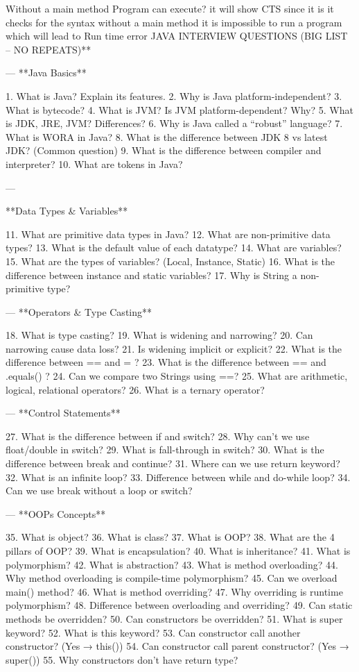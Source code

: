 Without a main method Program can execute?
it will show CTS since it is it checks for the syntax
without a main method it is impossible to run a program which will lead to Run time error
JAVA INTERVIEW QUESTIONS (BIG LIST – NO REPEATS)**

---
 **Java Basics**

1. What is Java? Explain its features.
2. Why is Java platform-independent?
3. What is bytecode?
4. What is JVM? Is JVM platform-dependent? Why?
5. What is JDK, JRE, JVM? Differences?
6. Why is Java called a “robust” language?
7. What is WORA in Java?
8. What is the difference between JDK 8 vs latest JDK? (Common question)
9. What is the difference between compiler and interpreter?
10. What are tokens in Java?

---

 **Data Types & Variables**

11. What are primitive data types in Java?
12. What are non-primitive data types?
13. What is the default value of each datatype?
14. What are variables?
15. What are the types of variables? (Local, Instance, Static)
16. What is the difference between instance and static variables?
17. Why is String a non-primitive type?

---
 **Operators & Type Casting**

18. What is type casting?
19. What is widening and narrowing?
20. Can narrowing cause data loss?
21. Is widening implicit or explicit?
22. What is the difference between == and = ?
23. What is the difference between == and .equals() ?
24. Can we compare two Strings using ==?
25. What are arithmetic, logical, relational operators?
26. What is a ternary operator?

---
 **Control Statements**

27. What is the difference between if and switch?
28. Why can't we use float/double in switch?
29. What is fall-through in switch?
30. What is the difference between break and continue?
31. Where can we use return keyword?
32. What is an infinite loop?
33. Difference between while and do-while loop?
34. Can we use break without a loop or switch?

---
 **OOPs Concepts**

35. What is object?
36. What is class?
37. What is OOP?
38. What are the 4 pillars of OOP?
39. What is encapsulation?
40. What is inheritance?
41. What is polymorphism?
42. What is abstraction?
43. What is method overloading?
44. Why method overloading is compile-time polymorphism?
45. Can we overload main() method?
46. What is method overriding?
47. Why overriding is runtime polymorphism?
48. Difference between overloading and overriding?
49. Can static methods be overridden?
50. Can constructors be overridden?
51. What is super keyword?
52. What is this keyword?
53. Can constructor call another constructor? (Yes → this())
54. Can constructor call parent constructor? (Yes → super())
55. Why constructors don’t have return type?

